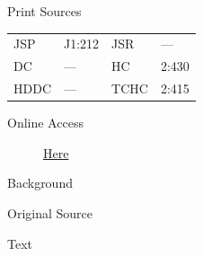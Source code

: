 			\begin{description}
					\item[Print Sources]
				\end{description}

					\begin{tabular}{p{0.5in}p{1in}p{0.5in}p{1in}}
					JSP	 	& J1:212		& JSR 		& --- \\
					DC	 	& ---			& HC 		& 2:430 \\
					HDDC 	& ---			& TCHC 		& 2:415 \\
					\end{tabular}
				
				\begin{description}
					\item[Online Access] \href{https://www.josephsmithpapers.org/paper-summary/revelation-29-march-1836-b/1}{Here}
				\end{description}
				
				\begin{description}
					\item[Background]
				\end{description}
				
				
				\begin{description}
					\item[Original Source]
				\end{description}
				
				
				\begin{description}
					\item[Text]
				\end{description}
				
